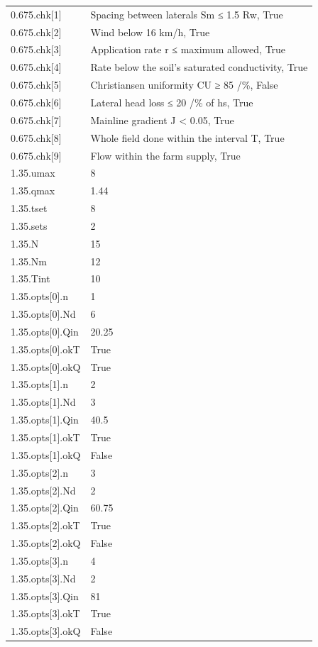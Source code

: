 {\begin{longtable}{p{}p{}}
{}0.675.chk[1] & Spacing between laterals Sm ≤ 1.5 Rw, True\\
{}0.675.chk[2] & Wind below 16 km/h, True\\
{}0.675.chk[3] & Application rate r ≤ maximum allowed, True\\
{}0.675.chk[4] & Rate below the soil’s saturated conductivity, True\\
{}0.675.chk[5] & Christiansen uniformity CU ≥ 85 /\%, False\\
{}0.675.chk[6] & Lateral head loss ≤ 20 /\% of hs, True\\
{}0.675.chk[7] & Mainline gradient J < 0.05, True\\
{}0.675.chk[8] & Whole field done within the interval T, True\\
{}0.675.chk[9] & Flow within the farm supply, True\\
{}1.35.umax & 8\\
{}1.35.qmax & 1.44\\
{}1.35.tset & 8\\
{}1.35.sets & 2\\
{}1.35.N & 15\\
{}1.35.Nm & 12\\
{}1.35.Tint & 10\\
{}1.35.opts[0].n & 1\\
{}1.35.opts[0].Nd & 6\\
{}1.35.opts[0].Qin & 20.25\\
{}1.35.opts[0].okT & True\\
{}1.35.opts[0].okQ & True\\
{}1.35.opts[1].n & 2\\
{}1.35.opts[1].Nd & 3\\
{}1.35.opts[1].Qin & 40.5\\
{}1.35.opts[1].okT & True\\
{}1.35.opts[1].okQ & False\\
{}1.35.opts[2].n & 3\\
{}1.35.opts[2].Nd & 2\\
{}1.35.opts[2].Qin & 60.75\\
{}1.35.opts[2].okT & True\\
{}1.35.opts[2].okQ & False\\
{}1.35.opts[3].n & 4\\
{}1.35.opts[3].Nd & 2\\
{}1.35.opts[3].Qin & 81\\
{}1.35.opts[3].okT & True\\
{}1.35.opts[3].okQ & False\\

\end{longtable}}
